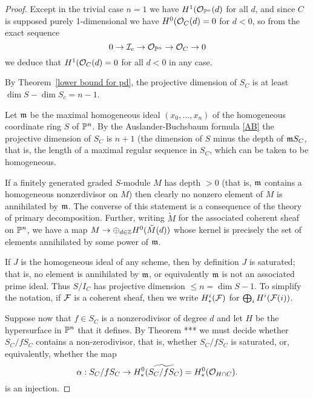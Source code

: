 \begin{proof}
 Except in the trivial case $n=1$ we have $H^{1}(\cO_{\PP^{n}} (d)$ for all $d$, and since 
$C$ is supposed purely 1-dimensional we have $H^{0}(\cO_{C}(d) = 0$ for $d<0$, so from the
exact sequence 
$$
0\to \cI_{c}\to \cO_{\PP^{n}} \to \cO_{C}\to 0
$$
we deduce that $H^{1}(\cO_{C}(d)= 0$ for all $d<0$ in any case.


By Theorem~\ref{lower bound for pd}, the projective dimension of $S_{C}$ is at least $\dim S -\dim S_{c}= n-1$.

 Let $\gm$ be the maximal homogeneous ideal $(x_{0},\dots, x_{n})$ of 
 the homogeneous coordinate ring $S$ of $\PP^{n}$.
 By the Auslander-Buchsbaum formula  \ref{AB} the projective dimension
 of $S_{C}$ is $n+1$ (the dimension of  $S$ minus the depth of $\gm S_{C}$, that is, the length of a maximal regular sequence in $S_{C}$, which can be taken to be homogeneous. 
 
 If a finitely generated graded $S$-module $M$ has depth $>0$ (that is, $\gm$ contains a homogeneous nonzerdivisor on $M$) then clearly no nonzero element of $M$ is annihilated by $\gm$. The converse of this statement is a consequence of the theory of primary decomposition. Further,
 writing $\tilde M$ for the associated coherent sheaf on $\PP^{n}$, we have a map
 $M \to \oplus_{d\in \ZZ}H^{0}(\tilde M(d))$ whose kernel is precisely the set of elements annihilated by
 some power of $\gm$.
 
 If $J$ is the homogeneous ideal of any scheme, then by definition $J$ is saturated; that is, no element is annihilated by $\gm$, or equivalently $\gm$ is not an associated prime ideal. Thus $S/I_{C}$ has projective dimension $\leq n = \dim S - 1$.
To simplify the notation, if $\cF$ is a coherent sheaf, then we write $H_{*}^{i}(\cF)$ for $\bigoplus_{i}H^{i}(\cF(i))$. 

Suppose now that $f\in S_{C}$ is a nonzerodivisor of degree $d$ and let $H$ be the hypersurface in $\PP^{n}$ that it defines. By Theorem *** we must decide whether $S_{C}/fS_{C}$ contains a non-zerodivisor, that is, whether 
$S_{C}/fS_{C}$ is saturated, or, equivalently, whether the map
$$
\alpha: S_{C}/fS_{C} \to H_{*}^{0}(\widetilde{S_{C}/fS_{C}})  = H_{*}^{0}(\cO_{H\cap C}). 
$$
is an injection.



\end{proof}
